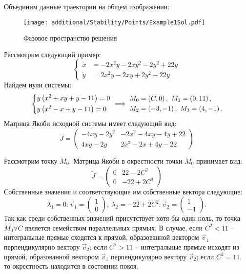 		Объединим данные траектории на общем изображении:
		\begin{figure}[H]
			\centering
			\texttt{[image: additional/Stability/Points/Example1Sol.pdf]}
			\caption{Фазовое пространство решения}
			\label{Stability:Example1Sol}
		\end{figure}

		Рассмотрим следующий пример:
		\[ \left\lbrace \begin{split}
			\dot{x} &= - 2 x^2 y - 2 x y^2 - 2 y^2 + 22 y \\
			\dot{y} &= 2 x^2 y - 2 x y + 2 y^2 - 22 y
		\end{split} \right. \]
		Найдем нули системы:
		\[ 
			\left\lbrace \begin{aligned} 
				&y \left( x^2 + xy + y - 11 \right) = 0 \\ &y \left( x^2 - x + y - 11 \right) = 0 
			 \end{aligned} \right. \implies \begin{split} 
				&M_0 = \left( C, 0 \right), ~ M_1 = \left( 0, 11 \right), \\ 
				&M_2 = \left( -3, -1 \right), ~ M_3 = \left( 4, -1 \right). 
			\end{split} 
		\]
		Матрица Якоби исходной системы имеет следующий вид: 
		\[
			\tilde{J} = \begin{pmatrix}
				- 4xy - 2y^2 & - 2 x^2 - 4xy - 4y + 22 \\ 
				4xy - 2y & 2 x^2 - 2x + 4y - 22
			\end{pmatrix}
		\]

		Рассмотрим точку $M_0$. Матрица Якоби в окрестности точки $M_0$ принимает вид:
		\[
			\tilde{J} = \begin{pmatrix}
				0 & 22 - 2C^2 \\
				0 & -22 + 2C^2
			\end{pmatrix}
		\]
		Собственные значения и соответствующие им собственные вектора следующие:
		\[ \lambda_1 = 0: \vec{v}_1 = \begin{pmatrix} 1 \\ 0 \end{pmatrix}, ~ \lambda_2 = -22 + 2C^2: \vec{v}_2 = \begin{pmatrix} 1 \\ -1 \end{pmatrix}. \]
		Так как среди собственных значений присутствует хотя-бы один ноль, то точка $M_0 \forall C$ является семейством параллельных прямых. В случае, если $C^2 < 11$ -- интегральные прямые сходятся к прямой, образованной вектором $\vec{v}_1$ перпендикулярно вектору $\vec{v}_2$; если $C^2 > 11$ -- интегральные прямые исходят из прямой, образованной вектором $\vec{v}_1$ перпендикулярно вектору $\vec{v}_2$; если $C^2 = 11$, то окрестность находится в состоянии покоя.

